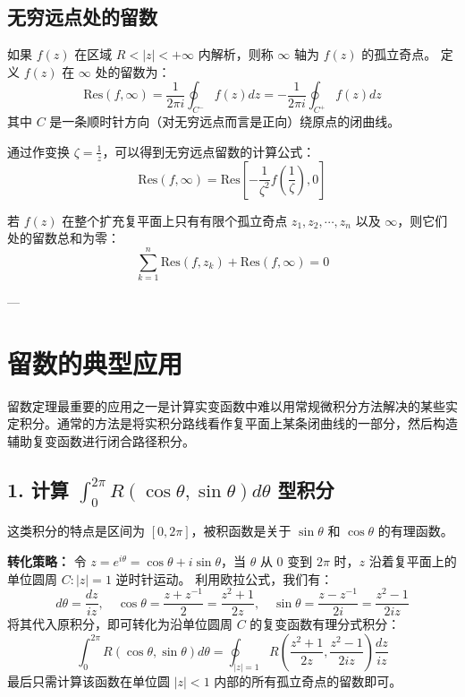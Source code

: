 \subsection{无穷远点处的留数}
如果 $f(z)$ 在区域 $R < |z| < +\infty$ 内解析，则称 $\infty$ 轴为 $f(z)$ 的孤立奇点。
定义 $f(z)$ 在 $\infty$ 处的留数为：
$$ \text{Res}(f, \infty) = \frac{1}{2\pi i} \oint_{C^-} f(z) dz = - \frac{1}{2\pi i} \oint_{C^+} f(z) dz $$
其中 $C$ 是一条顺时针方向（对无穷远点而言是正向）绕原点的闭曲线。

通过作变换 $\zeta = \frac{1}{z}$，可以得到无穷远点留数的计算公式：
$$ \text{Res}(f, \infty) = \text{Res}\left[ -\frac{1}{\zeta^2} f\left(\frac{1}{\zeta}\right), 0 \right] $$

\begin{theorem}[全平面留数总和定理]
	若 $f(z)$ 在整个扩充复平面上只有有限个孤立奇点 $z_1, z_2, \cdots, z_n$ 以及 $\infty$，则它们处的留数总和为零：
	$$ \sum_{k=1}^{n} \text{Res}(f, z_k) + \text{Res}(f, \infty) = 0 $$
\end{theorem}

---

\section{留数的典型应用}

留数定理最重要的应用之一是计算实变函数中难以用常规微积分方法解决的某些实定积分。通常的方法是将实积分路线看作复平面上某条闭曲线的一部分，然后构造辅助复变函数进行闭合路径积分。

\subsection{1. 计算 $\int_{0}^{2\pi} R(\cos\theta, \sin\theta) d\theta$ 型积分}
这类积分的特点是区间为 $[0, 2\pi]$，被积函数是关于 $\sin\theta$ 和 $\cos\theta$ 的有理函数。

\textbf{转化策略：}
令 $z = e^{i\theta} = \cos\theta + i\sin\theta$，当 $\theta$ 从 $0$ 变到 $2\pi$ 时，$z$ 沿着复平面上的单位圆周 $C: |z|=1$ 逆时针运动。
利用欧拉公式，我们有：
$$ d\theta = \frac{dz}{iz}, \quad \cos\theta = \frac{z + z^{-1}}{2} = \frac{z^2 + 1}{2z}, \quad \sin\theta = \frac{z - z^{-1}}{2i} = \frac{z^2 - 1}{2iz} $$
将其代入原积分，即可转化为沿单位圆周 $C$ 的复变函数有理分式积分：
$$ \int_{0}^{2\pi} R(\cos\theta, \sin\theta) d\theta = \oint_{|z|=1} R\left( \frac{z^2+1}{2z}, \frac{z^2-1}{2iz} \right) \frac{dz}{iz} $$
最后只需计算该函数在单位圆 $|z| < 1$ 内部的所有孤立奇点的留数即可。

